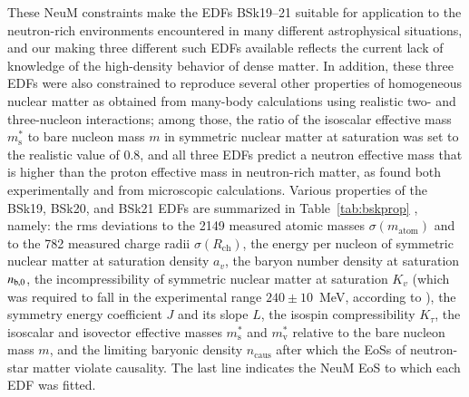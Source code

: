 \documentclass{aa}
\newcommand{\Rc}{R_\mathrm{ch}}
\begin{document}
These NeuM constraints make the EDFs BSk19--21 suitable for application
to the neutron-rich environments encountered in many different astrophysical
situations, and our making three different such EDFs available reflects the
current lack of knowledge of the high-density behavior of dense matter.
In addition, these three EDFs were also constrained to reproduce several other
properties of homogeneous nuclear matter as obtained from 
many-body calculations using realistic two- and three-nucleon interactions; 
among those, the ratio of the isoscalar effective mass
$m^*_\mathrm{s}$ to bare
nucleon mass $m$ in symmetric 
nuclear matter at saturation was set to the realistic value of 0.8, and 
all three EDFs predict a neutron effective mass that is
higher than the 
proton effective mass in neutron-rich matter, as found both experimentally and
from  microscopic calculations. Various properties of 
the BSk19, BSk20, and BSk21 EDFs are summarized in Table~\ref{tab:bskprop} 
\citep{Goriely-ea10}, namely: the rms deviations
to the 2149 measured atomic masses
$\sigma(m_\mathrm{atom})$ and to the 
782 measured charge radii $\sigma(\Rc)$, the energy per nucleon of symmetric nuclear matter at saturation density 
$a_v$, the baryon number density at saturation $n_{{\rm b},0}$, the incompressibility of symmetric 
nuclear matter at saturation $K_v$ (which was required to fall in the experimental range $240\pm10$~MeV, 
according to \citealt{colo04}), the symmetry energy coefficient $J$ and its slope $L$, the isospin 
compressibility $K_\tau$, the isoscalar and isovector
effective masses $m^*_\mathrm{s}$ and $m^*_\mathrm{v}$ relative to the bare
nucleon mass $m$, and the limiting baryonic 
density $n_\mathrm{caus}$
after which the EoSs of neutron-star matter violate causality. The last line indicates the 
NeuM EoS to which each EDF was fitted.
\end{document}
